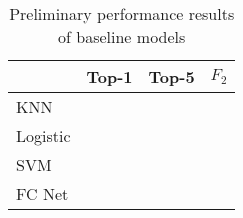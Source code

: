 \documentclass[10pt,twocolumn,letterpaper]{article}
\begin{document}
\begin{table}
   \begin{center}
   \begin{tabular}{|l|c|c|c|}
   \hline
   & Top-1 & Top-5 & $F_2$ \\
   \hline\hline
   KNN &&& \\
   Logistic &&& \\
   SVM &&& \\
   FC Net &&&\\
   \hline
   \end{tabular}
   \end{center}
   \caption{Preliminary performance results of baseline models}
\end{table}




{\small


}
\end{document}
